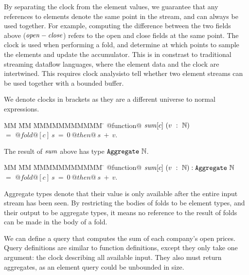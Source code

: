 By separating the clock from the element values, we guarantee that any references to elements denote the same point in the stream, and can always be used together.
For example, computing the difference between the two fields above ($\mathit{open} - \mathit{close}$) refers to the open and close fields at the same point.
The clock is used when performing a fold, and determine at which points to sample the elements and update the accumulator.
This is in constrast to traditional streaming dataflow languages, where the element data and the clock are intertwined.
This requires clock analysis\CITE to tell whether two element streams can be used together with a bounded buffer. 

We denote clocks in brackets as they are a different universe to normal expressions.
 

\begin{tabbing}
MM \= MM \= MMMMMMMMMMM \= \kill
@function@ 
$\mathit{sum}[c]~(v~:~\mathbb{N})$    \\
\> $=$  \> $@fold@[c]~s~=~0~@then@~s~+~v$. \\
\end{tabbing}

The result of $\mathit{sum}$ above has type $\mathtt{Aggregate}~\mathbb{N}$. 

\begin{tabbing}
MM \= MM \= MMMMMMMMMMM \= \kill
@function@ 
$\mathit{sum}[c]~(v~:~\mathbb{N}) : \mathtt{Aggregate}~\mathbb{N}$    \\
\> $=$  \> $@fold@[c]~s~=~0~@then@~s~+~v$. \\
\end{tabbing}



Aggregate types denote that their value is only available after the entire input stream has been seen. 
By restricting the bodies of folds to be element types, and their output to be aggregate types, it means no reference to the result of folds can be made in the body of a fold. 

We can define a query that computes the sum of each company's open prices.
Query definitions are similar to function definitions, except they only take one argument: the clock describing all available input.
They also must return aggregates, as an element query could be unbounded in size.

